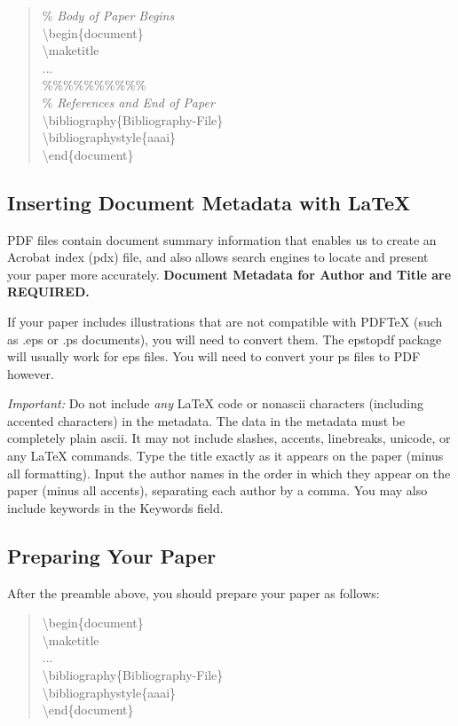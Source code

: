 \documentclass[letterpaper]{article}
\begin{document}
\begin{quote}
\begin{small}
\% \textit{Body of Paper Begins}\\
\textbackslash begin\{document\}\\
\textbackslash maketitle\\
...\\
\%\%\%\%\%\%\%\%\%\%\\
\% \textit{References and End of Paper}\\
\textbackslash bibliography\{Bibliography-File\}\\
\textbackslash bibliographystyle\{aaai\}\\
\textbackslash end\{document\}
\end{small}
\end{quote}

\subsection{Inserting Document Metadata with \LaTeX{}}
PDF files contain document summary information that enables us to create an Acrobat index (pdx) file, and also allows search engines to locate and present your paper more accurately. \textbf{Document Metadata  for Author and Title are REQUIRED.} 

If your paper includes illustrations that are not compatible with PDF\TeX{} (such as .eps or .ps documents), you will need to convert them. The epstopdf package will usually work for eps files. You will need to convert your ps files to PDF however.

\textit{Important:} Do not include \textit{any} \LaTeX{} code or nonascii characters (including accented characters) in the metadata. The data in the metadata must be completely plain ascii. It may not include slashes, accents, linebreaks, unicode, or any \LaTeX{} commands. Type the title exactly as it appears on the paper (minus all formatting). Input the author names in the order in which they appear on the paper (minus all accents), separating each author by a comma. You may also include keywords in the Keywords field.



\subsection{Preparing Your Paper}

After the preamble above, you should prepare your paper as follows:

\begin{quote}
\begin{small}
\textbackslash begin\{document\}\\
\textbackslash maketitle\\
...\\
\textbackslash bibliography\{Bibliography-File\}\\
\textbackslash bibliographystyle\{aaai\}\\
\textbackslash end\{document\}\\
\end{small}
\end{quote}
\end{document}
